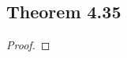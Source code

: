 \documentclass[../../main.tex]{subfiles}
\begin{document}
\subsection{Theorem 4.35}
\begin{wts}

\end{wts}
\begin{proof}

\end{proof}
\end{document}
